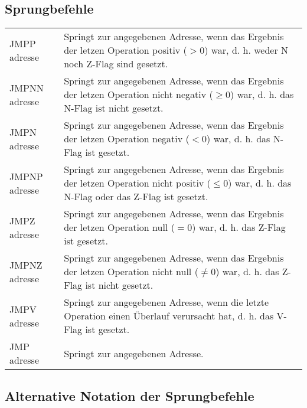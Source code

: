 \documentclass{lehramt-informatik-haupt}
\begin{document}
%

\subsection{Sprungbefehle}

\begin{tabularx}{\linewidth}{lX}
JMPP adresse &
Springt zur angegebenen Adresse, wenn das Ergebnis der letzen Operation
positiv ($> 0$) war, d. h. weder N noch Z-Flag sind gesetzt.
\\

JMPNN adresse &
Springt zur angegebenen Adresse, wenn das Ergebnis der letzen Operation
nicht negativ ($\geq 0$) war, d. h. das N-Flag ist nicht gesetzt. \\

JMPN adresse &
Springt zur angegebenen Adresse, wenn das Ergebnis der letzen Operation
negativ ($< 0$) war, d. h. das N-Flag ist gesetzt. \\

JMPNP adresse &
Springt zur angegebenen Adresse, wenn das Ergebnis der letzen Operation
nicht positiv ($\leq 0$) war, d. h. das N-Flag oder das Z-Flag ist gesetzt.
\\

JMPZ adresse &
Springt zur angegebenen Adresse, wenn das Ergebnis der letzen Operation
null ($= 0$) war, d. h. das Z-Flag ist gesetzt. \\

JMPNZ adresse &
Springt zur angegebenen Adresse, wenn das Ergebnis der letzen Operation
nicht null ($\neq 0$) war, d. h. das Z-Flag ist nicht gesetzt. \\

JMPV adresse &
Springt zur angegebenen Adresse, wenn die letzte Operation einen
Überlauf verursacht hat, d. h. das V-Flag ist gesetzt. \\

JMP adresse &
Springt zur angegebenen Adresse. \\
\end{tabularx}

%

\subsection{Alternative Notation der Sprungbefehle}
\end{document}
